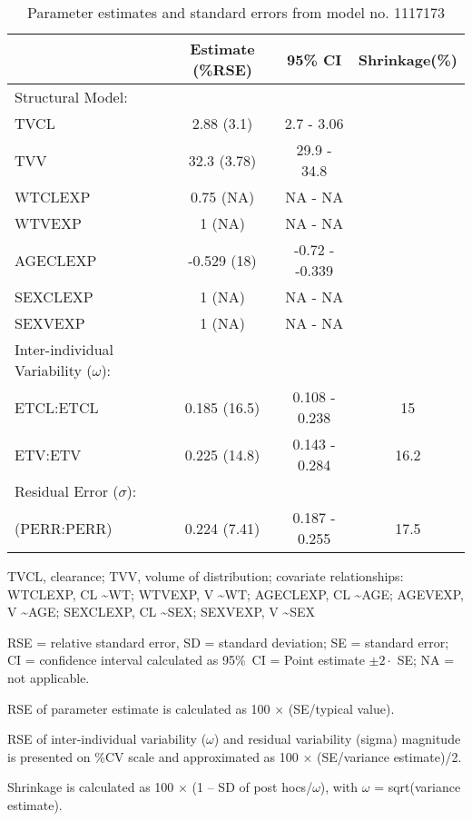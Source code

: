 \begin{table}[ht]
\begin{threeparttable}
\centering
\caption{Parameter estimates and standard errors from model no. 1117173} 
\label{tab:paramsum1117173}
\begingroup\small
\begin{tabular}{lccc}
  \hline
 & Estimate (\%RSE) & 95\% CI & Shrinkage(\%) \\ 
  \hline
Structural Model: &  &  &  \\ 
  TVCL & 2.88 (3.1) & 2.7 - 3.06 &  \\ 
  TVV & 32.3 (3.78) & 29.9 - 34.8 &  \\ 
  WTCLEXP & 0.75 (NA) & NA - NA &  \\ 
  WTVEXP & 1 (NA) & NA - NA &  \\ 
  AGECLEXP & -0.529 (18) & -0.72 - -0.339 &  \\ 
  SEXCLEXP & 1 (NA) & NA - NA &  \\ 
  SEXVEXP & 1 (NA) & NA - NA &  \\ 
  Inter-individual Variability ($\omega$): &  &  &  \\ 
  ETCL:ETCL & 0.185 (16.5) & 0.108 - 0.238 & 15 \\ 
  ETV:ETV & 0.225 (14.8) & 0.143 - 0.284 & 16.2 \\ 
  Residual Error ($\sigma$): &  &  &  \\ 
   (PERR:PERR) & 0.224 (7.41) & 0.187 - 0.255 & 17.5 \\ 
   \hline
\end{tabular}
\endgroup
\begin{tablenotes}\footnotesize
\item[] TVCL, clearance; TVV, volume of distribution; covariate relationships: WTCLEXP, CL \textasciitilde WT; WTVEXP, V \textasciitilde WT; AGECLEXP, CL \textasciitilde AGE; AGEVEXP, V \textasciitilde AGE; SEXCLEXP, CL \textasciitilde SEX; SEXVEXP, V \textasciitilde SEX
\item[] RSE = relative standard error, SD = standard deviation; SE = standard error; CI = confidence interval calculated as 95\%~CI = Point estimate $\pm 2 \cdot$ SE; NA = not applicable.
\item[] RSE of parameter estimate is calculated as 100 × (SE/typical value).
\item[] RSE of inter-individual variability ($\omega$) and residual variability (sigma) magnitude  is presented on \%CV scale and approximated as 100 × (SE/variance estimate)/2.
\item[] Shrinkage is calculated as 100 × (1 – SD of post hocs/$\omega$), with $\omega$ = sqrt(variance estimate).
\end{tablenotes}
\end{threeparttable}
\end{table}
